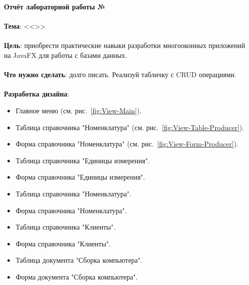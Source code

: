 \documentclass[12pt, a4paper, simple]{eskdtext}
\def \gpiDocTopic {Отчёт лабораторной работы №\gpiDocNum}
\begin{document}
    
    \begin{center}
        \textbf{\gpiDocTopic}
    \end{center}

    \paragraph{} \textbf{Тема}: <<\gpiTopicRep>>

    \paragraph{} \textbf{Цель}:
    приобрести практические навыки разработки многооконных приложений на JavaFX для работы с базами данных.

    \paragraph{} \textbf{Что нужно сделать}:
    долго писать.
    Реализуй табличку с CRUD операциями.

    \paragraph{} \textbf{Разработка дизайна}:

    \begin{itemize}
        \item Главное меню (см. рис.~\ref{fig:View-Main}).
        \item Таблица справочника "Номенклатура" (см. рис.~\ref{fig:View-Table-Producer}).
        \item Форма справочника "Номенклатура" (см. рис.~\ref{fig:View-Form-Producer}).
        \item Таблица справочника "Единицы измерения".
        \item Форма справочника "Единицы измерения".
        \item Таблица справочника "Номенклатура".
        \item Форма справочника "Номенклатура".
        \item Таблица справочника "Клиенты".
        \item Форма справочника "Клиенты".
        \item Таблица документа "Сборка компьютера".
        \item Форма документа "Сборка компьютера".
    \end{itemize}
\end{document}
